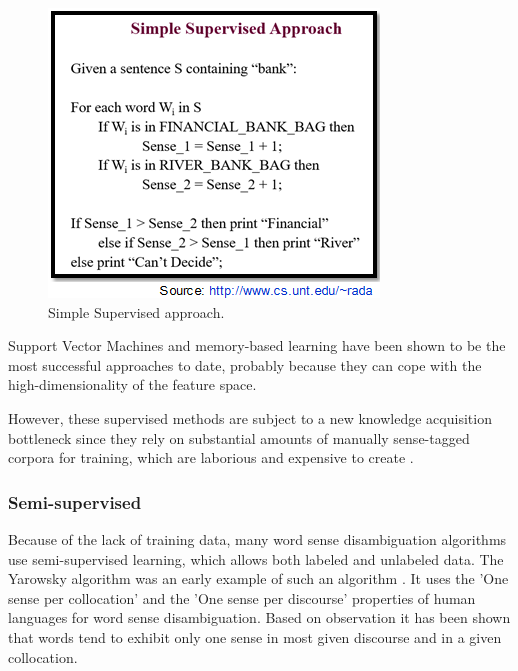 \begin{figure}[tbh]
	\begin{center}
		\includegraphics[width=\columnwidth]{Union_Background_Chart_sup3}
	\end{center}
	\caption{Simple Supervised approach.}
\end{figure}

Support Vector Machines and memory-based learning have been shown to be the most successful approaches to date, probably because they can cope with the high-dimensionality of the feature space. 

However, these supervised methods are subject to a new knowledge acquisition bottleneck since they rely on substantial amounts of manually sense-tagged corpora for training, which are laborious and expensive to create \cite{aramossoto2016onthe}.

\subsubsection*{Semi-supervised}

Because of the lack of training data, many word sense disambiguation algorithms use semi-supervised learning, which allows both labeled and unlabeled data. The Yarowsky algorithm was an early example of such an algorithm \cite{Gartner201317}. It uses the 'One sense per collocation' and the 'One sense per discourse' properties of human languages for word sense disambiguation. Based on observation it has been shown that words tend to exhibit only one sense in most given discourse and in a given collocation. \cite{5599823}

